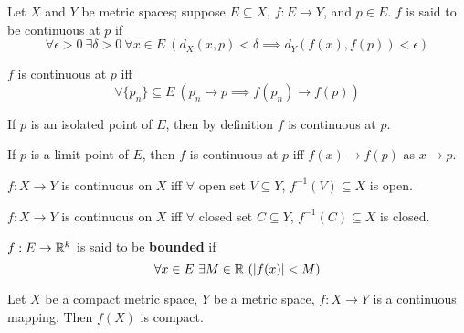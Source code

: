     \begin{defi}
        Let $X$ and $Y$ be metric spaces; suppose $E \subseteq X$, $f: E \to Y$, and $p \in E$. $f$ is said to be continuous at $p$ if
        \begin{equation}
            \forall \epsilon > 0 \ \exists \delta > 0 \ \forall x \in E \ \left( d_X(x,p) < \delta \implies d_Y(f(x),f(p)) < \epsilon \right)
        \end{equation}
    \end{defi}

    \begin{theo}
        $f$ is continuous at $p$ iff
        \begin{equation}
            \forall \{p_n\} \subseteq E \ (p_n \to p \implies f(p_n) \to f(p))
        \end{equation}
    \end{theo}

    \begin{rem}
        If $p$ is an isolated point of $E$, then by definition $f$ is continuous at $p$.
    \end{rem}

    \begin{theo}
        If $p$ is a limit point of $E$, then $f$ is continuous at $p$ iff $f(x) \to f(p)$ as $x \to p$.
    \end{theo}

    \begin{theo}
        $f: X \to Y$ is continuous on $X$ iff $\forall$ open set $V \subseteq Y$, $f^{-1}(V) \subseteq X$ is open.
    \end{theo}
    \begin{cor}
        $f: X \to Y$ is continuous on $X$ iff $\forall$ closed set $C \subseteq Y$, $f^{-1}(C) \subseteq X$ is closed.
    \end{cor}

    \begin{defi}
        $f: E \to \mathbb{R}^k$ is said to be \textbf{bounded} if
        \begin{equation}
            \forall x \in E \ \exists M \in \mathbb{R} \ ( | f(x) | < M )
        \end{equation}
    \end{defi}

    \begin{theo}
        Let $X$ be a compact metric space, $Y$ be a metric space, $f: X \to Y$ is a continuous mapping. Then $f(X)$ is compact.
    \end{theo}

